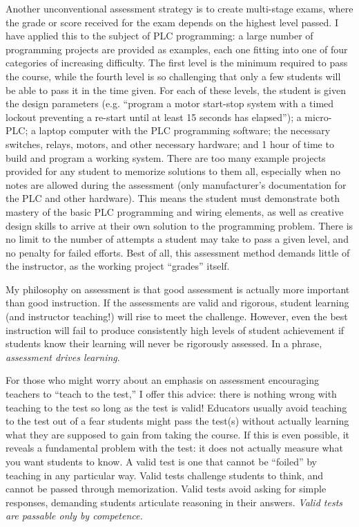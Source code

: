 Another unconventional assessment strategy is to create multi-stage exams, where the grade or score received for the exam depends on the highest level passed.  I have applied this to the subject of PLC programming: a large number of programming projects are provided as examples, each one fitting into one of four categories of increasing difficulty.  The first level is the minimum required to pass the course, while the fourth level is so challenging that only a few students will be able to pass it in the time given.  For each of these levels, the student is given the design parameters (e.g. ``program a motor start-stop system with a timed lockout preventing a re-start until at least 15 seconds has elapsed''); a micro-PLC; a laptop computer with the PLC programming software; the necessary switches, relays, motors, and other necessary hardware; and 1 hour of time to build and program a working system.  There are too many example projects provided for any student to memorize solutions to them all, especially when no notes are allowed during the assessment (only manufacturer's documentation for the PLC and other hardware).  This means the student must demonstrate both mastery of the basic PLC programming and wiring elements, as well as creative design skills to arrive at their own solution to the programming problem.  There is no limit to the number of attempts a student may take to pass a given level, and no penalty for failed efforts.  Best of all, this assessment method demands little of the instructor, as the working project ``grades'' itself.

\vskip 10pt

My philosophy on assessment is that good assessment is actually more important than good instruction.  If the assessments are valid and rigorous, student learning (and instructor teaching!) will rise to meet the challenge.  However, even the best instruction will fail to produce consistently high levels of student achievement if students know their learning will never be rigorously assessed.  In a phrase, \textit{assessment drives learning}.

For those who might worry about an emphasis on assessment encouraging teachers to ``teach to the test,'' I offer this advice: there is nothing wrong with teaching to the test so long as the test is valid!  Educators usually avoid teaching to the test out of a fear students might pass the test(s) without actually learning what they are supposed to gain from taking the course.  If this is even possible, it reveals a fundamental problem with the test: it does not actually measure what you want students to know.  A valid test is one that cannot be ``foiled'' by teaching in any particular way.  Valid tests challenge students to think, and cannot be passed through memorization.  Valid tests avoid asking for simple responses, demanding students articulate reasoning in their answers.  \textit{Valid tests are passable only by competence.}

